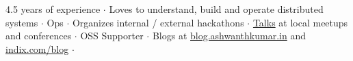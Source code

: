 

\begin{cvparagraph}
4.5 years of experience ${\cdotp}$ Loves to understand, build and operate distributed systems ${\cdotp}$ Ops ${\cdotp}$ Organizes internal / external hackathons ${\cdotp}$ \href{https://speakerdeck.com/ashwanthkumar}{Talks} at local meetups and conferences ${\cdotp}$ OSS Supporter ${\cdotp}$ Blogs at \href{http://blog.ashwanthkumar.in/}{blog.ashwanthkumar.in} and \href{http://www.indix.com/blog/author/ashwanth/}{indix.com/blog} ${\cdotp}$ 
\end{cvparagraph}
